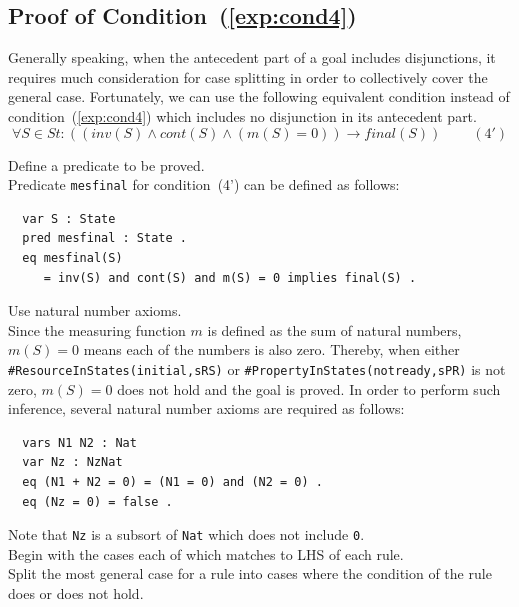 \documentclass[12pt]{report}
\newcommand{\ra}{\rightarrow}
\newcommand{\stt}[1]{{\small{\tt {#1}}}}
\begin{document}
\subsection{Proof of Condition~(\ref{exp:cond4})}
\label{sec:TOSCAmesfinal}
Generally speaking, when the antecedent part of a goal includes
disjunctions, it requires much consideration for case splitting in
order to collectively cover the general case. Fortunately, we can use
the following equivalent condition instead of
condition~(\ref{exp:cond4}) which includes no disjunction in its
antecedent part.
\[\forall S\in St:((inv(S)\land cont(S)\land(m(S) = 0))
  \ra final(S))~~~~~~~~~~(4')\]

\vspace{0.3cm}
 Define a predicate to be proved. \\ Predicate
         {\tt mesfinal} for condition~(4') can be defined as follows:
\small
\begin{verbatim}
  var S : State
  pred mesfinal : State .
  eq mesfinal(S)
     = inv(S) and cont(S) and m(S) = 0 implies final(S) .
\end{verbatim}
\normalsize

\vspace{0.3cm}
 Use natural number axioms. \\ Since the
measuring function $m$ is defined as the sum of natural numbers, $m(S)
= 0$ means each of the numbers is also zero. Thereby, when either
\stt{\#ResourceInStates(initial,sRS)} or
\stt{\#PropertyInStates(notready,sPR)} is not zero, $m(S) = 0$ does
not hold and the goal is proved. In order to perform such inference,
several natural number axioms are required as follows:
\small
\begin{verbatim}
  vars N1 N2 : Nat
  var Nz : NzNat
  eq (N1 + N2 = 0) = (N1 = 0) and (N2 = 0) .
  eq (Nz = 0) = false .
\end{verbatim}
\normalsize
Note that {\tt Nz} is a subsort of {\tt Nat} which does not
include {\tt 0}.\\

\vspace{0.3cm}
 Begin with the cases each of which matches to
LHS of each rule. \\ 
 Split the most general case for a rule into
cases where the condition of the rule does or does not hold. 
\end{document}
